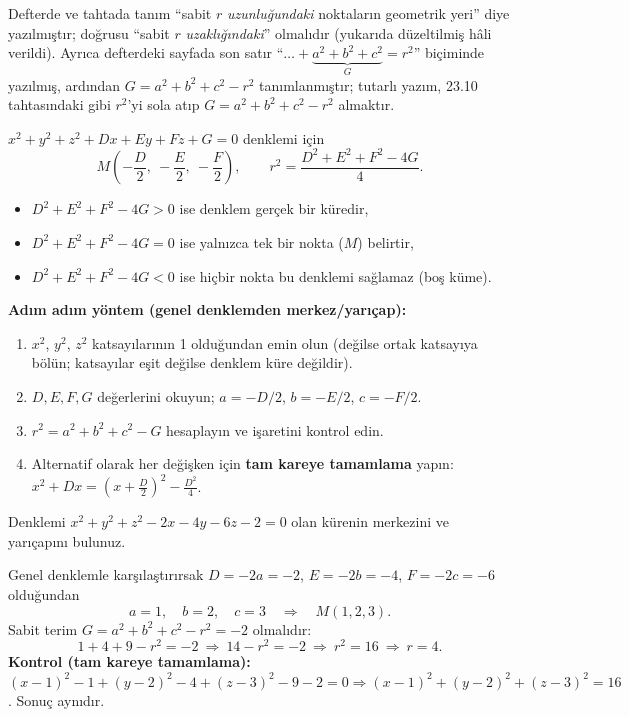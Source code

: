 \begin{bilgi}
Defterde ve tahtada tanım ``sabit $r$ \emph{uzunluğundaki} noktaların geometrik yeri'' diye yazılmıştır; doğrusu ``sabit $r$ \emph{uzaklığındaki}'' olmalıdır (yukarıda düzeltilmiş hâli verildi). Ayrıca defterdeki sayfada  son satır ``$\ldots+\underbrace{a^2+b^2+c^2}_{G}=r^2$'' biçiminde yazılmış, ardından $G=a^2+b^2+c^2-r^2$ tanımlanmıştır; tutarlı yazım, 23.10 tahtasındaki gibi $r^2$'yi sola atıp $G=a^2+b^2+c^2-r^2$ almaktır.
\end{bilgi}

\begin{teorem}
$x^2+y^2+z^2+Dx+Ey+Fz+G=0$ denklemi için
\[
M\left(-\frac D2,\ -\frac E2,\ -\frac F2\right),\qquad
r^2=\frac{D^2+E^2+F^2-4G}{4}.
\]
\begin{itemize}
\item $D^2+E^2+F^2-4G>0$ ise denklem gerçek bir küredir,
\item $D^2+E^2+F^2-4G=0$ ise yalnızca tek bir nokta ($M$) belirtir,
\item $D^2+E^2+F^2-4G<0$ ise hiçbir nokta bu denklemi sağlamaz (boş küme).
\end{itemize}
\end{teorem}

\textbf{Adım adım yöntem (genel denklemden merkez/yarıçap):}
\begin{enumerate}
\item $x^2$, $y^2$, $z^2$ katsayılarının 1 olduğundan emin olun (değilse ortak katsayıya bölün; katsayılar eşit değilse denklem küre değildir).
\item $D,E,F,G$ değerlerini okuyun; $a=-D/2$, $b=-E/2$, $c=-F/2$.
\item $r^2=a^2+b^2+c^2-G$ hesaplayın ve işaretini kontrol edin.
\item Alternatif olarak her değişken için \textbf{tam kareye tamamlama} yapın: $x^2+Dx=(x+\tfrac D2)^2-\tfrac{D^2}{4}$.
\end{enumerate}

\begin{soru}
Denklemi $x^2+y^2+z^2-2x-4y-6z-2=0$ olan kürenin merkezini ve yarıçapını bulunuz. 
\end{soru}
\begin{cevap}
Genel denklemle karşılaştırırsak $D=-2a=-2$, $E=-2b=-4$, $F=-2c=-6$ olduğundan
\[
a=1,\quad b=2,\quad c=3\quad\Rightarrow\quad M(1,2,3).
\]
Sabit terim $G=a^2+b^2+c^2-r^2=-2$ olmalıdır:
\[
1+4+9-r^2=-2\ \Rightarrow\ 14-r^2=-2\ \Rightarrow\ r^2=16\ \Rightarrow\ \boxed{r=4}.
\]
\textbf{Kontrol (tam kareye tamamlama):}
$(x-1)^2-1+(y-2)^2-4+(z-3)^2-9-2=0\Rightarrow (x-1)^2+(y-2)^2+(z-3)^2=16$. Sonuç aynıdır.
\end{cevap}

